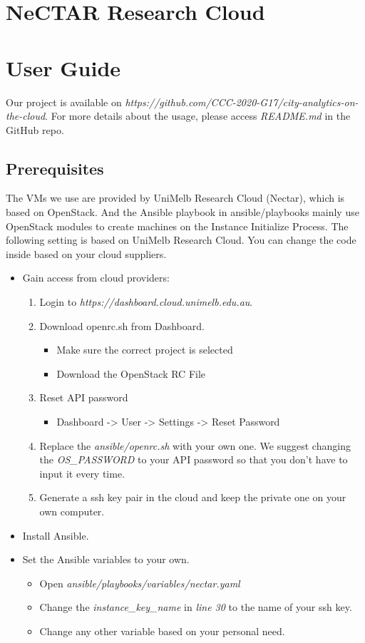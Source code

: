 \documentclass{article}
\begin{document}
\section{NeCTAR Research Cloud}

\clearpage
\section{User Guide}
Our project is available on \textit{https://github.com/CCC-2020-G17/city-analytics-on-the-cloud}. For more details about the usage, please access \textit{README.md} in the GitHub repo.
\subsection{Prerequisites}
The VMs we use are provided by UniMelb Research Cloud (Nectar), which is based on OpenStack. And the Ansible playbook in ansible/playbooks mainly use OpenStack modules to create machines on the Instance Initialize Process. The following setting is based on UniMelb Research Cloud. You can change the code inside based on your cloud suppliers.
\begin{itemize}
	\item Gain access from cloud providers:
	\begin{enumerate}
		\item Login to \textit{https://dashboard.cloud.unimelb.edu.au}.
		\item Download openrc.sh from Dashboard.
		\begin{itemize}
			\item Make sure the correct project is selected
			\item Download the OpenStack RC File
		\end{itemize}
		\item Reset API password
		\begin{itemize}
			\item Dashboard -> User -> Settings -> Reset Password
		\end{itemize}
	    \item Replace the \textit{ansible/openrc.sh} with your own one. We suggest changing the \textit{OS\_PASSWORD} to your API password so that you don't have to input it every time.
	    \item Generate a ssh key pair in the cloud and keep the private one on your own computer.
	\end{enumerate}
	\item Install Ansible.
	\item Set the Ansible variables to your own.
	\begin{itemize}
		\item Open \textit{ansible/playbooks/variables/nectar.yaml}
		\item Change the \textit{instance\_key\_name} in \textit{line 30} to the name of your ssh key.
		\item Change any other variable based on your personal need.
	\end{itemize}
\end{itemize}
\end{document}
